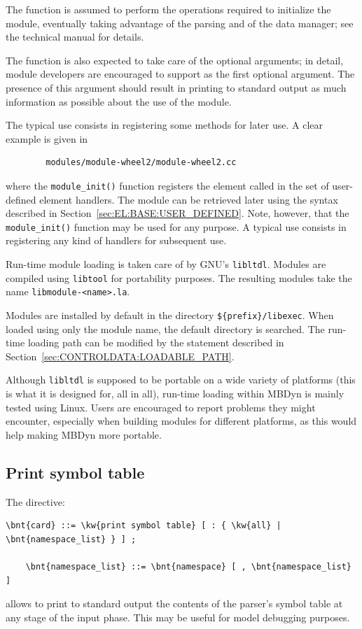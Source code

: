 The function is assumed to perform the operations required to initialize
the module, eventually taking advantage of the parsing
and of the data manager; see the technical manual for details.

The function is also expected to take care of the optional 
arguments; in detail, module developers are encouraged to support
 as the first optional argument.
The presence of this argument should result in printing to standard output
as much information as possible about the use of the module.

The typical use consists in registering some methods for later use.
A clear example is given in
\begin{verbatim}
        modules/module-wheel2/module-wheel2.cc
\end{verbatim}
where the \texttt{module\_init()} function registers
the  element called 
in the set of user-defined element handlers.
The module can be retrieved later using the syntax described
in Section~\ref{sec:EL:BASE:USER_DEFINED}.
Note, however, that the \texttt{module\_init()} function may be used
for any purpose.
A typical use consists in registering any kind of handlers
for subsequent use.

Run-time module loading is taken care of by GNU's \texttt{libltdl}.
Modules are compiled using \texttt{libtool} for portability purposes.
The resulting modules take the name
\texttt{libmodule-<name>.la}.

Modules are installed by default in the directory
\texttt{\$\{prefix\}/libexec}.
When loaded using only the module name, the default directory is searched.
The run-time loading path can be modified by the 
 statement described
in Section~\ref{sec:CONTROLDATA:LOADABLE_PATH}.

Although \texttt{libltdl} is supposed to be portable on a wide variety
of platforms (this is what it is designed for, all in all),
run-time loading within MBDyn is mainly tested using Linux.
Users are encouraged to report problems they might encounter,
especially when building modules for different platforms,
as this would help making MBDyn more portable.



\subsection{Print symbol table}
The  directive:
\begin{Verbatim}[commandchars=\\\{\}]
    \bnt{card} ::= \kw{print symbol table} [ : { \kw{all} | \bnt{namespace_list} } ] ;

    \bnt{namespace_list} ::= \bnt{namespace} [ , \bnt{namespace_list} ]
\end{Verbatim}
allows to print to standard output the contents of the parser's symbol
table at any stage of the input phase.
This may be useful for model debugging purposes.


